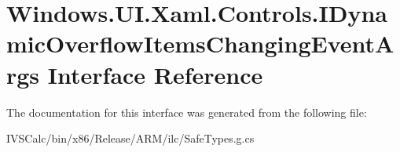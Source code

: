 \hypertarget{interface_windows_1_1_u_i_1_1_xaml_1_1_controls_1_1_i_dynamic_overflow_items_changing_event_args}{}\section{Windows.\+U\+I.\+Xaml.\+Controls.\+I\+Dynamic\+Overflow\+Items\+Changing\+Event\+Args Interface Reference}
\label{interface_windows_1_1_u_i_1_1_xaml_1_1_controls_1_1_i_dynamic_overflow_items_changing_event_args}


The documentation for this interface was generated from the following file\+:\begin{DoxyCompactItemize}
\item 
I\+V\+S\+Calc/bin/x86/\+Release/\+A\+R\+M/ilc/Safe\+Types.\+g.\+cs\end{DoxyCompactItemize}
